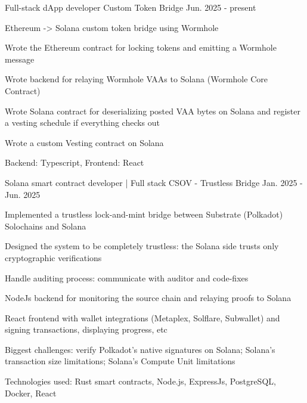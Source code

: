 

\begin{cventries}
  \cventry
  {Full-stack dApp developer} %
  {Custom Token Bridge} %
  {} %
  {Jun. 2025 - present} %
  {
    \begin{cvitems} %
      \item {Ethereum -> Solana custom token bridge using Wormhole}
      \item {Wrote the Ethereum contract for locking tokens and emitting a Wormhole message}
      \item {Wrote backend for relaying Wormhole VAAs to Solana (Wormhole Core Contract)}
      \item {Wrote Solana contract for deserializing posted VAA bytes on Solana and register a vesting schedule if everything checks out}
      \item {Wrote a custom Vesting contract on Solana}
      \item {Backend: Typescript, Frontend: React}
    \end{cvitems}
  }
  
  \cventry
  {Solana smart contract developer | Full stack} %
  {CSOV - Trustless Bridge} %
  {} %
  {Jan. 2025 - Jun. 2025} %
  {
    \begin{cvitems} %
      \item {Implemented a trustless lock-and-mint bridge between Substrate (Polkadot) Solochains and Solana}
      \item {Designed the system to be completely trustless: the Solana side trusts only cryptographic verifications}
      \item {Handle auditing process: communicate with auditor and code-fixes}
      \item {NodeJs backend for monitoring the source chain and relaying proofs to Solana}
      \item {React frontend with wallet integrations (Metaplex, Solflare, Subwallet) and signing transactions, displaying progress, etc}
      \item {Biggest challenges: verify Polkadot's native signatures on Solana; Solana's transaction size limitations; Solana's Compute Unit limitations}
      \item {Technologies used: Rust smart contracts, Node.js, ExpressJs, PostgreSQL, Docker, React}
    \end{cvitems}
  }
  

\end{cventries}
